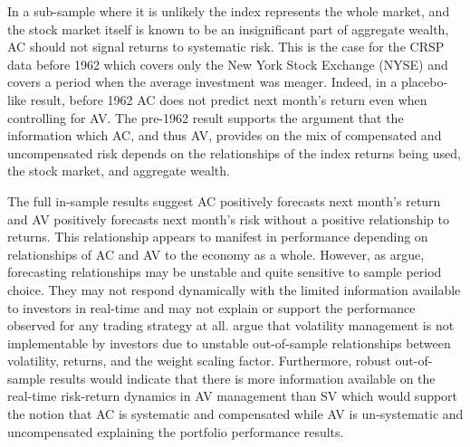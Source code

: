 In a sub-sample where it is unlikely the index represents the whole market, and the stock market itself is known to be an insignificant part of aggregate wealth, AC should not signal returns to systematic risk. This is the case for the CRSP data before 1962 which covers only the New York Stock Exchange (NYSE) and covers a period when the average investment was meager. \citep{taylor_2014} Indeed, in a placebo-like result, before 1962 AC does not predict next month's return even when controlling for AV. The pre-1962 result supports the \citet{pollet_average_2010} argument that the information which AC, and thus AV, provides on the mix of compensated and uncompensated risk depends on the relationships of the index returns being used, the stock market, and aggregate wealth.

The full in-sample results suggest AC positively forecasts next month's return and AV positively forecasts next month's risk without a positive relationship to returns. This relationship appears to manifest in performance depending on relationships of AC and AV to the economy as a whole. However, as \citet{Welch2008} argue, forecasting relationships may be unstable and quite sensitive to sample period choice. They may not respond dynamically with the limited information available to investors in real-time and may not explain or support the performance observed for any trading strategy at all. \citet{cederburg_2019} argue that volatility management is not implementable by investors due to unstable out-of-sample relationships between volatility, returns, and the \citet{moreira_volatility-managed_2017} weight scaling factor. Furthermore, robust out-of-sample results would indicate that there is more information available on the real-time risk-return dynamics in AV management than SV which would support the notion that AC is systematic and compensated while AV is un-systematic and uncompensated explaining the portfolio performance results.

